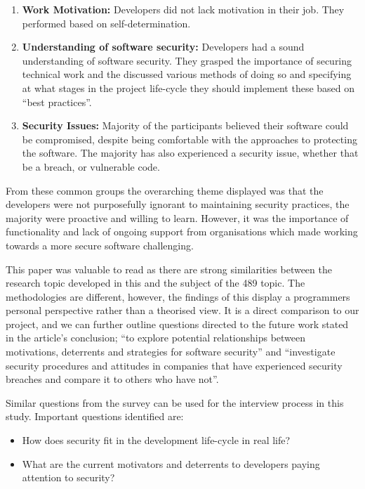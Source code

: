 \begin{enumerate}
\item \textbf{Work Motivation:} Developers did not lack motivation in their job. They performed based on self-determination.
\item \textbf{Understanding of software security:} Developers had a sound understanding of software security. They grasped the importance of securing technical work and the discussed various methods of doing so and specifying at what stages in the project life-cycle they should implement these based on “best practices”.
\item \textbf{Security Issues:} Majority of the participants believed their software could be compromised, despite being comfortable with the approaches to protecting the software. The majority has also experienced a security issue, whether that be a breach, or vulnerable code.
\end{enumerate}

\par From these common groups the overarching theme displayed was that the developers were not purposefully ignorant to maintaining security practices, the majority were proactive and willing to learn. However, it was the importance of functionality and lack of ongoing support from organisations which made working towards a more secure software challenging. 
\newline
\par This paper was valuable to read as there are strong similarities between the research topic developed in this and the subject of the 489 topic. The methodologies are different, however, the findings of this display a programmers personal perspective rather than a theorised view. It is a direct comparison to our project, and we can further outline questions directed to the future work stated in the article's conclusion; “to explore potential relationships between motivations, deterrents and strategies for software security” and “investigate security procedures and attitudes in companies that have experienced security breaches and compare it to others who have not”. 
\newline
\par Similar questions from the survey can be used for the interview process in this study. Important questions identified are:

\begin{itemize}
\item How does security fit in the development life-cycle in real life? 
\item What are the current motivators and deterrents to developers paying attention to security? 
\end{itemize}

